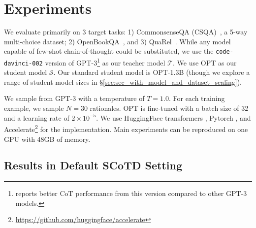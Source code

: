 \documentclass[11pt]{article}
\newcommand\jack[1]{{\color{orange}[#1]$_{Jack}$}}
\newcommand\yj[1]{{\color{olive}[#1]$_{YJ}$}}
\begin{document}
\section{Experiments}

\label{sec:sec_with_experiments}

We evaluate primarily on 3 target tasks: 1) CommonsenseQA (CSQA)~\cite{talmor2019commonsenseqa}, a 5-way multi-choice dataset; 2) OpenBookQA~\cite{OpenBookQA2018},  and 3) QuaRel~\cite{tafjord2019quarel}. While any model capable of few-shot chain-of-thought could be substituted, we use the \texttt{code-davinci-002} version of GPT-3\footnote{ \citet{wang2022rationale}  reports better CoT performance from this version compared to other GPT-3 models.} \cite{NEURIPS2020_1457c0d6} as our teacher model $\mathcal{T}$.
We use OPT \cite{OPTLM} as our student model $\mathcal{S}$. %
Our standard student model is OPT-1.3B (though we explore a range of student model sizes in \S\ref{sec:sec_with_model_and_dataset_scaling}). 

We sample from GPT-3 with a temperature of $T = 1.0$. For each training example, we sample $N=30$ rationales. 
OPT is fine-tuned with a batch size of 32 and a learning rate of $2\times10^{-5}$. %
We use HuggingFace transformers \cite{transformers}, Pytorch \cite{NEURIPS2019_9015}, and Accelerate\footnote{\url{https://github.com/huggingface/accelerate}} for the implementation. Main experiments can be reproduced on one GPU with 48GB of memory.


\subsection{Results in Default SCoTD Setting}
\label{sec:main_results}
\label{sec:sec_with_supervised_results}
\end{document}
